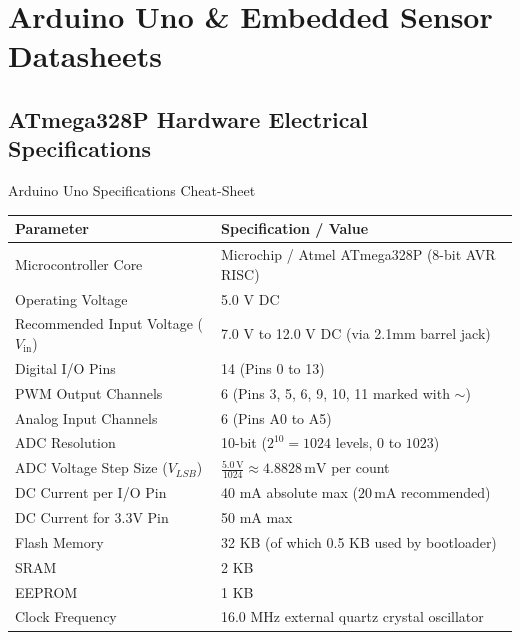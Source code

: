 \chapter{Arduino Uno \& Embedded Sensor Datasheets}

\section{ATmega328P Hardware Electrical Specifications}
\begin{formulabox}{Arduino Uno Specifications Cheat-Sheet}
\begin{center}
\begin{tabular}{ll}
\toprule
\textbf{Parameter} & \textbf{Specification / Value} \\
\midrule
Microcontroller Core & Microchip / Atmel ATmega328P (8-bit AVR RISC) \\
Operating Voltage & 5.0 V DC \\
Recommended Input Voltage ($V_{\mathrm{in}}$) & 7.0 V to 12.0 V DC (via 2.1mm barrel jack) \\
Digital I/O Pins & 14 (Pins 0 to 13) \\
PWM Output Channels & 6 (Pins 3, 5, 6, 9, 10, 11 marked with $\sim$) \\
Analog Input Channels & 6 (Pins A0 to A5) \\
ADC Resolution & 10-bit ($2^{10} = 1024$ levels, $0$ to $1023$) \\
ADC Voltage Step Size ($V_{LSB}$) & $\frac{5.0\,\mathrm{V}}{1024} \approx 4.8828\,\mathrm{mV}$ per count \\
DC Current per I/O Pin & 40 mA absolute max ($20\,\mathrm{mA}$ recommended) \\
DC Current for 3.3V Pin & 50 mA max \\
Flash Memory & 32 KB (of which 0.5 KB used by bootloader) \\
SRAM & 2 KB \\
EEPROM & 1 KB \\
Clock Frequency & 16.0 MHz external quartz crystal oscillator \\
\bottomrule
\end{tabular}
\end{center}
\end{formulabox}

